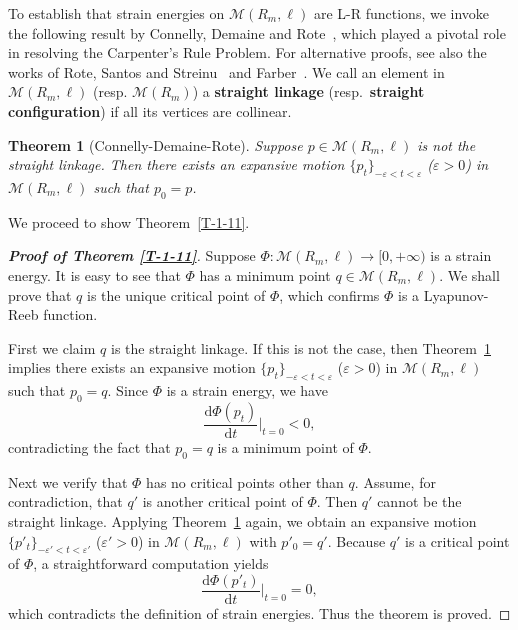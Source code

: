 \documentclass[11pt,letterpaper]{amsart}
\theoremstyle{plain}
\newtheorem{theorem}{Theorem}[section]
\theoremstyle{definition}
\theoremstyle{remark}
\numberwithin{equation}{section}
\begin{document}
To establish that strain energies on $\mathcal M(R_m,\ell)$ are L-R functions, we invoke the following result by Connelly, Demaine and Rote~\cite[Theorem 3]{Connelly-2003}, which played a pivotal role in resolving the Carpenter's Rule Problem. For alternative proofs, see also the works of Rote, Santos and Streinu~\cite[Theorem 4.3]{Rote-2003} and Farber~\cite[Chap.~3]{Farber-2008}. We call an element in $\mathcal M(R_m,\ell)$ (resp. $\mathcal M(R_m)$) a \textbf{straight linkage} (resp.~\textbf{straight configuration}) if all its vertices are collinear.

\begin{theorem}[Connelly-Demaine-Rote]\label{T-3-2}
Suppose $p\in \mathcal M(R_m,\ell)$ is not the straight linkage. Then there exists an expansive motion $\{p_t\}_{-\varepsilon<t<\varepsilon}$ ($\varepsilon>0$) in $\mathcal M(R_m,\ell)$ such that $p_0=p$.
\end{theorem}


We proceed to show Theorem~\ref{T-1-11}.

\begin{proof}[\textbf{Proof of Theorem \ref{T-1-11}}]
Suppose $\Phi:\mathcal M(R_m,\ell)\to[0,+\infty)$ is a strain energy. It is easy to see that $\Phi$ has a minimum point $q\in \mathcal M(R_m,\ell)$. We shall prove that $q$ is the unique critical point of $\Phi$, which confirms $\Phi$ is a Lyapunov-Reeb function.

First we claim $q$ is the straight linkage. If this is not the case, then Theorem~\ref{T-3-2} implies there exists an expansive motion $\{p_t\}_{-\varepsilon<t<\varepsilon}$ ($\varepsilon>0$) in
$\mathcal M(R_m,\ell)$ such that $p_0=q$. Since $\Phi$ is a strain energy, we have
\[
\frac{\mathrm{d}\Phi(p_t)}{\mathrm{d}t}\bigg|_{t=0}<0,
\]
contradicting the fact that $p_0=q$ is a minimum point of $\Phi$.

Next we verify that $\Phi$ has no critical points other than $q$. Assume, for contradiction, that $q'$ is another critical point of $\Phi$. Then $q'$ cannot be the straight linkage. Applying Theorem~\ref{T-3-2} again, we obtain an expansive motion $\{p'_t\}_{-\varepsilon'<t<\varepsilon'}$ ($\varepsilon'>0$) in $\mathcal M(R_m,\ell)$ with $p'_0=q'$. Because $q'$ is a critical point of $\Phi$, a straightforward computation yields
\[
\frac{\mathrm{d}\Phi(p'_t)}{\mathrm{d}t}\bigg|_{t=0}=0,
\]
which contradicts the definition of strain energies. Thus the theorem is proved.
\end{proof}
\end{document}
